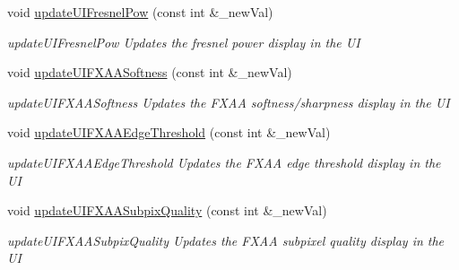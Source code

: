 \begin{DoxyCompactItemize}
void \hyperlink{classMainWindow_aeee147386c4fe45b4982baa47bd1279f}{update\-U\-I\-Fresnel\-Pow} (const int \&\-\_\-new\-Val)
\begin{DoxyCompactList}\small\item\em update\-U\-I\-Fresnel\-Pow Updates the fresnel power display in the U\-I \end{DoxyCompactList}\item 
void \hyperlink{classMainWindow_a5d1e3243d8388757e82037391ffd677b}{update\-U\-I\-F\-X\-A\-A\-Softness} (const int \&\-\_\-new\-Val)
\begin{DoxyCompactList}\small\item\em update\-U\-I\-F\-X\-A\-A\-Softness Updates the F\-X\-A\-A softness/sharpness display in the U\-I \end{DoxyCompactList}\item 
void \hyperlink{classMainWindow_a6483ad1b0e680d1a1627295f76ce6f4a}{update\-U\-I\-F\-X\-A\-A\-Edge\-Threshold} (const int \&\-\_\-new\-Val)
\begin{DoxyCompactList}\small\item\em update\-U\-I\-F\-X\-A\-A\-Edge\-Threshold Updates the F\-X\-A\-A edge threshold display in the U\-I \end{DoxyCompactList}\item 
void \hyperlink{classMainWindow_ac5f09fce95033810b6fcb286547ad306}{update\-U\-I\-F\-X\-A\-A\-Subpix\-Quality} (const int \&\-\_\-new\-Val)
\begin{DoxyCompactList}\small\item\em update\-U\-I\-F\-X\-A\-A\-Subpix\-Quality Updates the F\-X\-A\-A subpixel quality display in the U\-I \end{DoxyCompactList}\end{DoxyCompactItemize}

